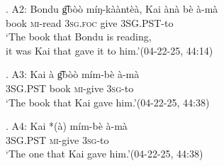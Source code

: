 \documentclass{assets/fieldnotes}
\begin{document}
\cg. A2: Bondu g͡bòò míŋ-kààntèà, Kai ànà bè à-mà\\
{} {} book \textsc{mi}-read {} \textsc{3sg.foc} give \textsc{3SG.PST}-to\\
`The book that Bondu is reading,\\it was Kai that gave it to him.’\hfill{(04-22-25, 44:14)}

\dg. A3: Kai à g͡bòò mím-bè à-mà\\
{} {} \textsc{3SG.PST} book \textsc{mi}-give \textsc{3sg}-to\\
`The book that Kai gave him.’\hfill{(04-22-25, 44:38)}

\eg. A4: Kai *(à) mím-bè à-mà\\
{} {} \textsc{3SG.PST} \textsc{mi}-give \textsc{3sg}-to\\
`The one that Kai gave him.’\hfill{(04-22-25, 44:38)}
\end{document}
